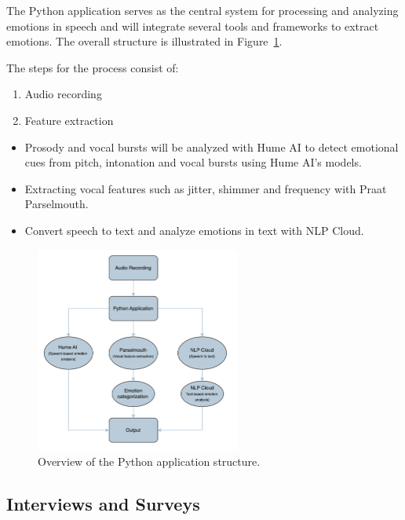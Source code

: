 The Python application serves as the central system for processing and analyzing emotions in speech and will integrate several tools and frameworks to extract emotions. The overall structure is illustrated in Figure~\ref{fig:tf-python-app}.

The steps for the process consist of:

\begin{enumerate}
    \item Audio recording
    \item Feature extraction
\end{enumerate}

\begin{itemize}
    \item Prosody and vocal bursts will be analyzed with Hume AI to detect emotional cues from pitch, intonation and vocal bursts using Hume AI’s models.
    \item Extracting vocal features such as jitter, shimmer and frequency with Praat Parselmouth.
    \item Convert speech to text and analyze emotions in text with NLP Cloud.
\end{itemize}

\begin{figure}[H]
    \centering
    \includegraphics[width=0.6\textwidth]{png/results/rq1_nr3/python-app.pdf}
    \caption{Overview of the Python application structure.}
    \label{fig:tf-python-app}
\end{figure}
    

\subsection{Interviews and Surveys}
\label{sec:theo-interviews}

